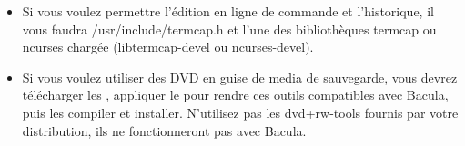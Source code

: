 \begin{itemize}
\item Si vous voulez permettre l'\'edition en ligne de  commande et
   l'historique, il vous faudra  /usr/include/termcap.h et l'une des
   biblioth\`eques  termcap ou ncurses charg\'ee (libtermcap-devel ou 
ncurses-devel).
\item Si vous voulez utiliser des DVD en guise de media de sauvegarde, vous devrez 
   t\'el\'echarger les , 
   appliquer le  
   pour rendre ces outils compatibles avec Bacula, puis les compiler et installer. 
   N'utilisez pas les dvd+rw-tools fournis par votre distribution, ils ne 
   fonctionneront pas avec Bacula.

\end{itemize}
